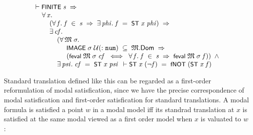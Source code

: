\documentclass[letterpaper]{article}
\renewcommand{\HOLConst}[1]{{\textsf{\upshape\small #1}}}
\newenvironment{holmath}{\begin{displaymath}\begin{array}{l}}{\end{array}\end{displaymath}\ignorespacesafterend}
\begin{document}
\begin{holmath}
  \ensuremath{\HOLTokenTurnstile}\HOLConst{FINITE}\;\HOLFreeVar{s}\;\HOLSymConst{\HOLTokenImp{}}\\
\;\;\;\;\;\HOLSymConst{\HOLTokenForall{}}\HOLBoundVar{x}.\\
\;\;\;\;\;\;\;\;\;(\HOLSymConst{\HOLTokenForall{}}\HOLBoundVar{f}.\;\HOLBoundVar{f}\;\HOLSymConst{\HOLTokenIn{}}\;\HOLFreeVar{s}\;\HOLSymConst{\HOLTokenImp{}}\;\HOLSymConst{\HOLTokenExists{}}\HOLBoundVar{phi}.\;\HOLBoundVar{f}\;\HOLSymConst{=}\;\HOLConst{ST}\;\HOLBoundVar{x}\;\HOLBoundVar{phi})\;\HOLSymConst{\HOLTokenImp{}}\\
\;\;\;\;\;\;\;\;\;\HOLSymConst{\HOLTokenExists{}}\HOLBoundVar{cf}.\\
\;\;\;\;\;\;\;\;\;\;\;\;\;(\HOLSymConst{\HOLTokenForall{}}\HOLBoundVar{\ensuremath{\mathfrak{M}}}\;\HOLBoundVar{\ensuremath{\sigma}}.\\
\;\;\;\;\;\;\;\;\;\;\;\;\;\;\;\;\;\;\HOLConst{IMAGE}\;\HOLBoundVar{\ensuremath{\sigma}}\;\ensuremath{\cal{U}}(:\HOLTyOp{num})\;\HOLSymConst{\HOLTokenSubset{}}\;\HOLBoundVar{\ensuremath{\mathfrak{M}}}.\HOLFieldName{Dom}\;\HOLSymConst{\HOLTokenImp{}}\\
\;\;\;\;\;\;\;\;\;\;\;\;\;\;\;\;\;\;(\HOLConst{feval}\;\HOLBoundVar{\ensuremath{\mathfrak{M}}}\;\HOLBoundVar{\ensuremath{\sigma}}\;\HOLBoundVar{cf}\;\HOLSymConst{\HOLTokenEquiv{}}\;\HOLSymConst{\HOLTokenForall{}}\HOLBoundVar{f}.\;\HOLBoundVar{f}\;\HOLSymConst{\HOLTokenIn{}}\;\HOLFreeVar{s}\;\HOLSymConst{\HOLTokenImp{}}\;\HOLConst{feval}\;\HOLBoundVar{\ensuremath{\mathfrak{M}}}\;\HOLBoundVar{\ensuremath{\sigma}}\;\HOLBoundVar{f}))\;\HOLSymConst{\HOLTokenConj{}}\\
\;\;\;\;\;\;\;\;\;\;\;\;\;\HOLSymConst{\HOLTokenExists{}}\HOLBoundVar{psi}.\;\HOLBoundVar{cf}\;\HOLSymConst{=}\;\HOLConst{ST}\;\HOLBoundVar{x}\;\HOLBoundVar{psi}
  \ensuremath{\HOLTokenTurnstile}\HOLConst{ST}\;\HOLFreeVar{x}\;(\HOLSymConst{\HOLTokenNeg{}}\HOLFreeVar{f})\;\HOLSymConst{=}\;\HOLConst{fNOT}\;(\HOLConst{ST}\;\HOLFreeVar{x}\;\HOLFreeVar{f})
\end{holmath}



Standard translation defined like this can be regarded as a first-order reformulation of modal satisfication, since we have the precise correspondence of modal satisfication and first-order satisfication for standard translations. A modal formula is satisfied a point $w$ in a modal model iff its standrad translation at $x$ is satisfied at the same modal viewed as a first order model when $x$ is valuated to $w$:
\end{document}
